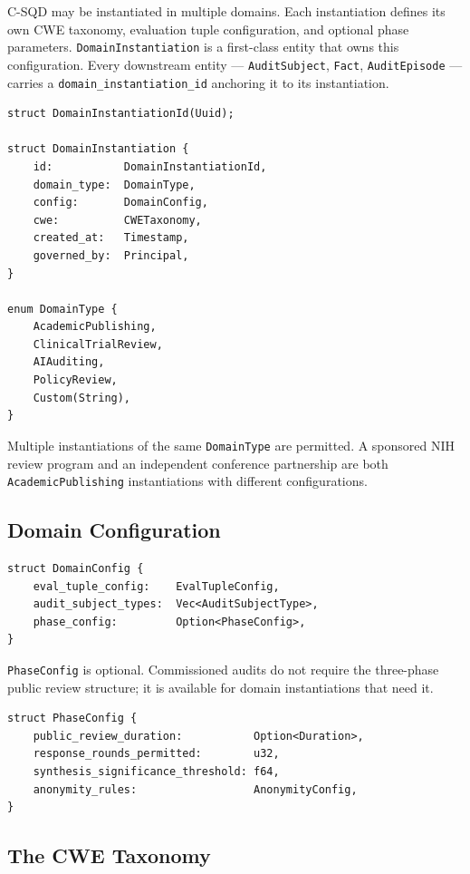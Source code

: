 \documentclass[11pt]{article}
\begin{document}
C-SQD may be instantiated in multiple domains. Each instantiation defines its
own CWE taxonomy, evaluation tuple configuration, and optional phase parameters.
\texttt{DomainInstantiation} is a first-class entity that owns this
configuration. Every downstream entity --- \texttt{AuditSubject}, \texttt{Fact},
\texttt{AuditEpisode} --- carries a \texttt{domain\_instantiation\_id} anchoring
it to its instantiation.

\begin{lstlisting}
struct DomainInstantiationId(Uuid);

struct DomainInstantiation {
    id:           DomainInstantiationId,
    domain_type:  DomainType,
    config:       DomainConfig,
    cwe:          CWETaxonomy,
    created_at:   Timestamp,
    governed_by:  Principal,
}

enum DomainType {
    AcademicPublishing,
    ClinicalTrialReview,
    AIAuditing,
    PolicyReview,
    Custom(String),
}
\end{lstlisting}

Multiple instantiations of the same \texttt{DomainType} are permitted. A
sponsored NIH review program and an independent conference partnership are both
\texttt{AcademicPublishing} instantiations with different configurations.

\subsection{Domain Configuration}

\begin{lstlisting}
struct DomainConfig {
    eval_tuple_config:    EvalTupleConfig,
    audit_subject_types:  Vec<AuditSubjectType>,
    phase_config:         Option<PhaseConfig>,
}
\end{lstlisting}

\texttt{PhaseConfig} is optional. Commissioned audits do not require the
three-phase public review structure; it is available for domain instantiations
that need it.

\begin{lstlisting}
struct PhaseConfig {
    public_review_duration:           Option<Duration>,
    response_rounds_permitted:        u32,
    synthesis_significance_threshold: f64,
    anonymity_rules:                  AnonymityConfig,
}
\end{lstlisting}

\subsection{The CWE Taxonomy}
\end{document}
